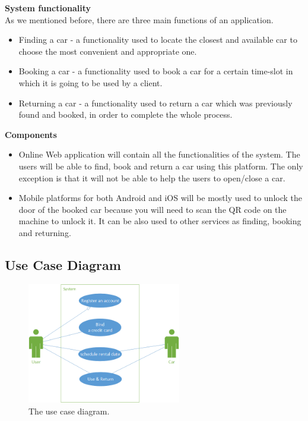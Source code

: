 \documentclass{article}
\begin{document}
    \newpage
    \textbf{System functionality}\\
    As we mentioned before, there are three main functions of an application.
    \begin{itemize}
        \item Finding a car - a functionality used to locate the closest and available car to choose the most convenient and appropriate one.
        \item Booking a car - a functionality used to book a car for a certain time-slot in which it is going to be used by a client.
        \item Returning a car - a functionality used to return a car which was previously found and booked, in order to complete the whole process.
    \end{itemize}
    
    \textbf{Components}
    \begin{itemize}
        \item Online Web application will contain all the functionalities of the system. The users will be able to find, book and return a car using this platform. The only exception is that it will not be able to help the users to open/close a car.
        \item Mobile platforms for both Android and iOS will be mostly used to unlock the door of the booked car because you will need to scan the QR code on the machine to unlock it. It can be also used to other services as finding, booking and returning.
    \end{itemize}
    
    
    \subsection{Use Case Diagram}
        \begin{figure}[h]
            \centering
            \includegraphics[width=0.6\textwidth]{img/UseCaseDiagram.png}
            \caption{The use case diagram.}
            \label{fig:useCaseDiagram}
        \end{figure}
    
\end{document}
